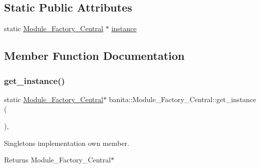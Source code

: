 \subsection*{Static Public Attributes}
\begin{DoxyCompactItemize}
\item 
static \mbox{\hyperlink{classbanita_1_1_module___factory___central}{Module\+\_\+\+Factory\+\_\+\+Central}} $\ast$ \mbox{\hyperlink{classbanita_1_1_module___factory___central_ad7153b8c574028a3165263b7159ac450}{instance}}
\end{DoxyCompactItemize}


\subsection{Member Function Documentation}
\mbox{\label{classbanita_1_1_module___factory___central_aba0eb5d045a61c1e85684c3e00ce62f5}} 
\subsubsection{\texorpdfstring{get\_instance()}{get\_instance()}}
{\footnotesize\ttfamily static \mbox{\hyperlink{classbanita_1_1_module___factory___central}{Module\+\_\+\+Factory\+\_\+\+Central}}$\ast$ banita\+::\+Module\+\_\+\+Factory\+\_\+\+Central\+::get\+\_\+instance (\begin{DoxyParamCaption}{ }\end{DoxyParamCaption})\hspace{0.3cm}{\ttfamily [inline]}, {\ttfamily [static]}}



Singleton\textquotesingle{}s implementation own member. 

\begin{DoxyReturn}{Returns}
Module\+\_\+\+Factory\+\_\+\+Central$\ast$ 
\end{DoxyReturn}
\mbox{\label{classbanita_1_1_module___factory___central_a1ac99380daaa5ab3a5dffb29181e6858}} 
